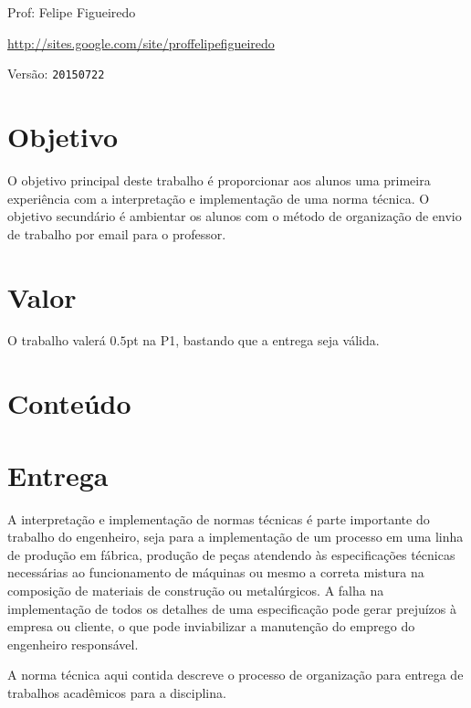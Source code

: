 \documentclass[a4paper]{article}
\begin{document}
\parbox[c]{.825\textwidth}{\raggedright%
{Prof: Felipe Figueiredo\par}
{\url{http://sites.google.com/site/proffelipefigueiredo}\par}
}

Versão: \verb|20150722|



\section{Objetivo}
O objetivo principal deste trabalho é proporcionar aos alunos uma
primeira experiência com a interpretação e implementação de uma norma
técnica. O objetivo secundário é ambientar os alunos com o método de
organização de envio de trabalho por email para o professor.

\section{Valor}
O trabalho valerá $0.5$pt na P1, bastando que a entrega seja válida.

\section{Conteúdo}



\section{Entrega}
A interpretação e implementação de normas técnicas é parte importante
do trabalho do engenheiro, seja para a implementação de um processo em
uma linha de produção em fábrica, produção de peças atendendo às
especificações técnicas necessárias ao funcionamento de máquinas ou
mesmo a correta mistura na composição de materiais de construção ou
metalúrgicos. A falha na implementação de todos os detalhes de uma
especificação pode gerar prejuízos à empresa ou cliente, o que pode
inviabilizar a manutenção do emprego do engenheiro responsável.

A norma técnica aqui contida descreve o processo de organização para
entrega de trabalhos acadêmicos para a disciplina.
\end{document}
